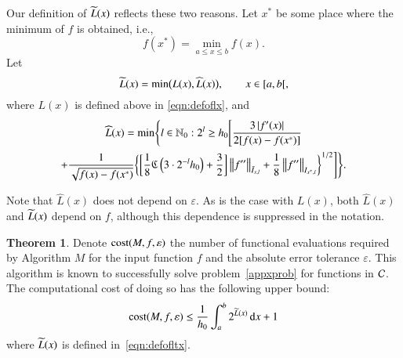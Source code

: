 \documentclass[review]{elsarticle}
\newcommand{\abstol}{\varepsilon}
\theoremstyle{definition}
\newcommand{\chL}{\widehat{L}}
\newtheorem{theorem}{Theorem}
\begin{document}
Our definition of $\widetilde{L}(x)$ reflects these two reasons.  Let $x^*$ be some place where the minimum of $f$ is obtained, i.e.,
\[
f(x^*)  = \min_{a \le x \le b} f(x).
\]
Let
\begin{equation}\label{eqn:defofltx}
\tL(x) = \min\bigl(L(x),\chL(x)\bigr), \qquad x \in [a,b[,
\end{equation}
where $L(x)$ is defined above in \eqref{eqn:defoflx}, and
\begin{multline}\label{eqn:defoflt1x}
\chL(x) = \min \Biggl\{ l \in \mathbb{N}_0 :  2^l \ge h_0 \Biggl[ \frac{3\abs{f'(x)}}{2[f(x) - f(x^*)]} \\
+  \frac{1}{\sqrt{f(x) - f(x^*)}} \biggl\{ \biggl[\frac 18 \fC\left(3\cdot2^{-l}h_0\right) + \frac 32 \biggr]   \norm[\bar{I}_{x,l}]{f''}
+ \frac18\norm[{I_{x^*,l}}]{f''} \biggr\}^{1/2} \Biggr] \Biggr\}.
\end{multline}

Note that $\chL(x)$ does not depend on $\abstol$.
As is the case with $L(x)$, both $\chL(x)$ and $\widetilde{L}(x)$  depend on $f$, although this dependence is suppressed in the notation.

\begin{theorem}\label{thm:Mcost}
	Denote $\cost(M,f,\abstol)$ the number of functional evaluations required by Algorithm $M$ for the input function $f$ and the absolute error tolerance $\abstol$.  This algorithm is known to successfully solve problem~\eqref{appxprob} for functions in $\mathcal{C}$.  The computational cost of doing so has the following upper bound:
	\begin{equation*}
	\cost(M,f,\abstol) \le \frac{1}{h_0}\int_a^b 2^{\tL(x)} \, \dif x +1 \\
	\end{equation*}
	where $\widetilde{L}(x)$ is defined in~\eqref{eqn:defofltx}.
\end{theorem}
\end{document}
